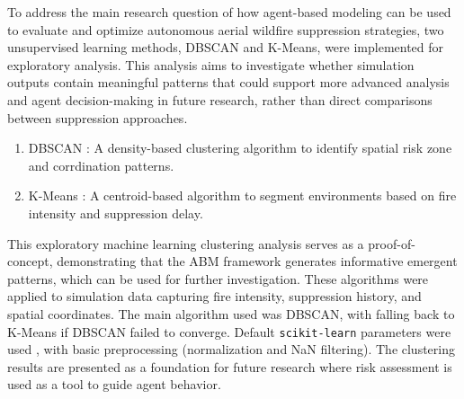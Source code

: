 \documentclass[11pt, a4paper]{article}
\begin{document}
To address the main research question of how agent-based modeling can be used to evaluate and optimize autonomous aerial wildfire suppression strategies, two unsupervised learning methods, DBSCAN and K-Means, were implemented for exploratory analysis. This analysis aims to investigate whether simulation outputs contain meaningful patterns that could support more advanced analysis and agent decision-making in future research, rather than direct comparisons between suppression approaches.
\begin{enumerate}
    \item DBSCAN \citep{dbscan}: A density-based clustering algorithm to identify spatial risk zone and corrdination patterns.
    \item K-Means \citep{kmeans}: A centroid-based algorithm to segment environments based on fire intensity and suppression delay.
\end{enumerate}

This exploratory machine learning clustering analysis serves as a proof-of-concept, demonstrating that the ABM framework generates informative emergent patterns, which can be used for further investigation. These algorithms were applied to simulation data capturing fire intensity, suppression history, and spatial coordinates. The main algorithm used was DBSCAN, with falling back to K-Means if DBSCAN failed to converge. Default \texttt{scikit-learn} parameters were used \citep{scikit-learn}, with basic preprocessing (normalization and NaN filtering). The clustering results are presented as a foundation for future research where risk assessment is used as a tool to guide agent behavior. 
\end{document}
